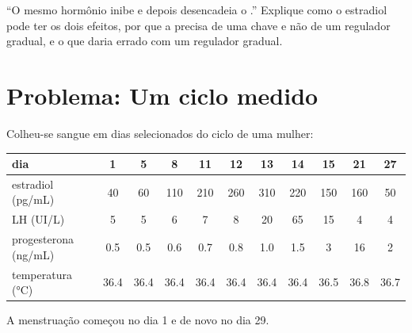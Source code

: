 \begin{exercise}[$\star\star\star$]\label{exo:b2:reproductive-hormones:12}
``O mesmo hormônio inibe e depois desencadeia o .'' Explique
como o estradiol pode ter os dois efeitos, por que a  precisa
de uma chave e não de um regulador gradual, e o que daria errado com um
regulador gradual.
\end{exercise}

\section{Problema: Um ciclo medido}

\begin{problem}
\label{pb:b2:reproductive-hormones:1}
Colheu-se sangue em dias selecionados do ciclo de uma mulher:

\begin{center}
\small
\begin{tabular}{lcccccccccc}
\hline
dia & 1 & 5 & 8 & 11 & 12 & 13 & 14 & 15 & 21 & 27 \\
\hline
estradiol (\unit{pg/mL}) & 40 & 60 & 110 & 210 & 260 & 310 & 220 & 150 & 160 & 50 \\
LH (\unit{UI/L}) & 5 & 5 & 6 & 7 & 8 & 20 & 65 & 15 & 4 & 4 \\
progesterona (\unit{ng/mL}) & 0.5 & 0.5 & 0.6 & 0.7 & 0.8 & 1.0 & 1.5 & 3 & 16 & 2 \\
temperatura (\unit{\celsius}) & 36.4 & 36.4 & 36.4 & 36.4 & 36.4 & 36.4 & 36.4 & 36.5 & 36.8 & 36.7 \\
\hline
\end{tabular}
\end{center}

A menstruação começou no dia 1 e de novo no dia 29.


\end{problem}
